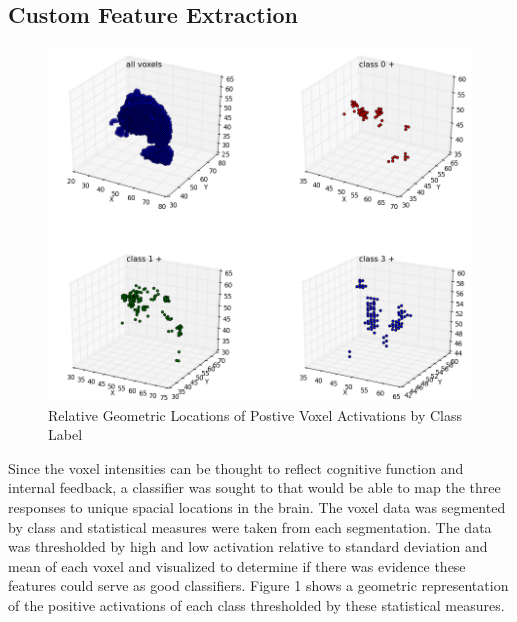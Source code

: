 \documentclass{article} %
\begin{document}
\subsection{Custom Feature Extraction}

\begin{figure}
	\begin{center}
		\includegraphics[scale=.25]{media/pos_4x4_formatted.png}
	\end{center}
	\caption{Relative Geometric Locations of Postive Voxel Activations by Class Label}
	\vspace{-20pt}
\end{figure}

Since the voxel intensities can be thought to reflect cognitive function and internal feedback, a classifier was sought to that would be able to map the three responses to unique spacial locations in the brain. The voxel data was segmented by class and statistical measures were taken from each segmentation. The data was thresholded by high  and low activation relative to standard deviation and mean of each voxel and visualized to determine if there was evidence these features could serve as good classifiers. Figure 1 shows a geometric representation of the positive activations of each class thresholded by these statistical measures.
\end{document}
